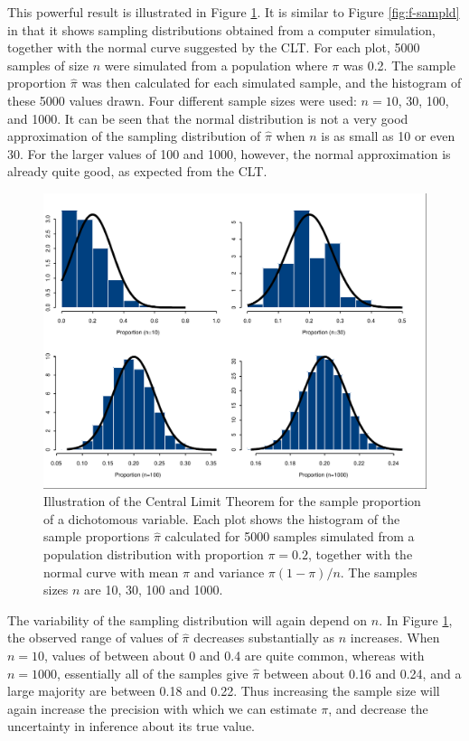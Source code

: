 \documentclass[11pt,a4paper,openany]{book}
\begin{document}
This powerful result is illustrated in Figure \ref{fig:f-cltbin}. It is
similar to Figure \ref{fig:f-sampld} in that it shows sampling
distributions obtained from a computer simulation, together with the
normal curve suggested by the CLT. For each plot, 5000 samples of size
\(n\) were simulated from a population where \(\pi\) was 0.2. The sample
proportion \(\hat{\pi}\) was then calculated for each simulated sample,
and the histogram of these 5000 values drawn. Four different sample
sizes were used: \(n=10\), 30, 100, and 1000. It can be seen that the
normal distribution is not a very good approximation of the sampling
distribution of \(\hat{\pi}\) when \(n\) is as small as 10 or even 30.
For the larger values of 100 and 1000, however, the normal approximation
is already quite good, as expected from the CLT.

\begin{figure}[htbp]
\centering
\includegraphics[width=14.00000cm]{sampld_p.pdf}
\caption{\label{fig:f-cltbin} Illustration of the Central Limit Theorem for
the sample proportion of a dichotomous variable. Each plot shows the
histogram of the sample proportions \(\hat{\pi}\) calculated for 5000
samples simulated from a population distribution with proportion
\(\pi=0.2\), together with the normal curve with mean \(\pi\) and
variance \(\pi(1-\pi)/n\). The samples sizes \(n\) are 10, 30, 100 and
1000.}
\end{figure}

The variability of the sampling distribution will again depend on \(n\).
In Figure \ref{fig:f-cltbin}, the observed range of values of
\(\hat{\pi}\) decreases substantially as \(n\) increases. When \(n=10\),
values of between about 0 and 0.4 are quite common, whereas with
\(n=1000\), essentially all of the samples give \(\hat{\pi}\) between
about 0.16 and 0.24, and a large majority are between 0.18 and 0.22.
Thus increasing the sample size will again increase the precision with
which we can estimate \(\pi\), and decrease the uncertainty in inference
about its true value.
\end{document}
